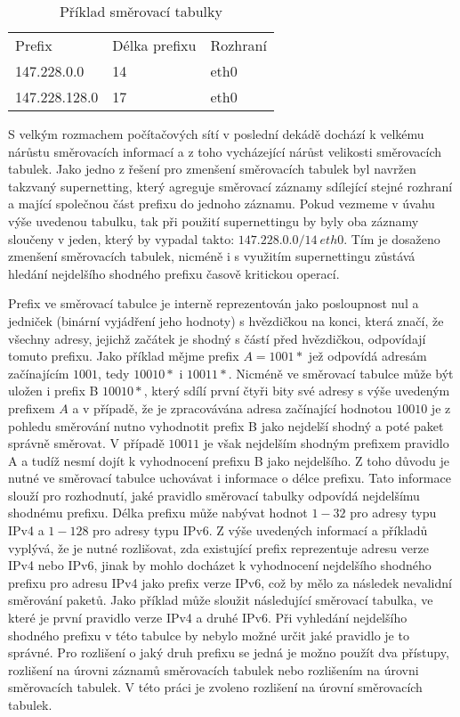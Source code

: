 \begin{table}[!htbp]
	\center
    \begin{tabular}{|l|l|l|}
    \hline
    Prefix        & Délka prefixu & Rozhraní \\ \hhline{|=|=|=|}
    147.228.0.0   & 14            & eth0       \\ \hline
    147.228.128.0 & 17            & eth0       \\ \hline
    \end{tabular}
    \caption{Příklad směrovací tabulky}
    \label{tab:routing-table}
\end{table}

S velkým rozmachem počítačových sítí v poslední dekádě dochází k velkému nárůstu směrovacích informací a z toho vycházející nárůst velikosti směrovacích tabulek. Jako jedno z řešení pro zmenšení směrovacích tabulek byl navržen takzvaný supernetting, který agreguje směrovací záznamy
sdílející stejné rozhraní a mající společnou část prefixu do jednoho záznamu.
Pokud vezmeme v úvahu výše uvedenou tabulku, tak při použití supernettingu by byly oba záznamy sloučeny
v jeden, který by vypadal takto: $147.228.0.0/14~eth0$.
Tím je dosaženo zmenšení směrovacích tabulek, nicméně i s využitím supernettingu zůstává hledání nejdelšího shodného
prefixu časově kritickou operací.

Prefix ve směrovací tabulce je interně reprezentován jako posloupnost nul a jedniček (binární vyjádření jeho hodnoty) s hvězdičkou na konci, která značí, že všechny adresy, jejichž začátek je shodný s částí před hvězdičkou, odpovídají tomuto prefixu.
Jako příklad mějme prefix $A = 1001*$ jež odpovídá adresám začínajícím $1001$, tedy $10010*$ i $10011*$.
Nicméně ve směrovací tabulce může být uložen i prefix B $10010*$, který sdílí první čtyři bity své adresy
s výše uvedeným prefixem $A$ a v případě, že je zpracovávána adresa začínající hodnotou $10010$ je z pohledu směrování
nutno vyhodnotit prefix B jako nejdelší shodný a poté paket správně směrovat. V případě $10011$ je však nejdelším
shodným prefixem pravidlo A a tudíž nesmí dojít k vyhodnocení prefixu B jako nejdelšího.
Z toho důvodu je nutné ve směrovací tabulce uchovávat i informace o délce prefixu.
Tato informace slouží pro rozhodnutí, jaké pravidlo směrovací tabulky odpovídá nejdelšímu shodnému prefixu.
Délka prefixu může nabývat hodnot $1-32$ pro adresy typu
IPv4 a $1-128$ pro adresy typu IPv6.
Z výše uvedených informací a příkladů vyplývá,
že je nutné rozlišovat, zda existující prefix reprezentuje adresu verze IPv4 nebo IPv6,
jinak by mohlo docházet k vyhodnocení nejdelšího shodného prefixu pro adresu IPv4
jako prefix verze IPv6, což by mělo za následek nevalidní směrování paketů.
Jako příklad může sloužit následující směrovací tabulka, ve které je první pravidlo
verze IPv4 a druhé IPv6. Při vyhledání nejdelšího shodného prefixu v této tabulce by nebylo možné určit jaké pravidlo je to správné.
Pro rozlišení o jaký druh prefixu se jedná je možno použít dva přístupy, rozlišení na úrovni
záznamů směrovacích tabulek nebo rozlišením na úrovni směrovacích tabulek. V této práci je zvoleno rozlišení
na úrovní směrovacích tabulek.

